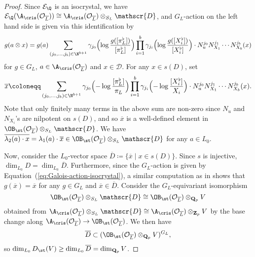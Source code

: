 \begin{proof}
Since $\mathcal{E}_\Q$ is an isocrystal, we have $\mathcal{E}_\Q(\A_{\cris}(\mathcal{O}_{\overline{L}})) \cong \A_{\cris}(\mathcal{O}_{\overline{L}})\otimes_{S_L} \mathscr{D}$, and $G_L$-action on the left hand side is given via this identification by
\begin{equation} \label{eq:Galois-action-isocrystal}
g(a\otimes x) = g(a)\sum_{(j_0, \ldots, j_b)\in \N^{b+1}} \gamma_{j_0}\Bigl(\operatorname{log}\frac{g([\pi_L^{\flat}])}{[\pi_L^{\flat}]}\Bigr)\prod_{i=1}^b \gamma_{j_i}\Bigl(\operatorname{log}\frac{g([X_i^{\flat}])}{[X_i^{\flat}]}\Bigr) \cdot N_u^{j_0}N_{X_1}^{j_1}\cdots N_{X_b}^{j_b}(x)    
\end{equation}
for $g \in G_L$, $a \in \A_{\cris}(\mathcal{O}_{\overline{L}})$ and $x \in \mathscr{D}$. For any $x \in s(D)$, set
\[
\overline{x} \coloneqq \sum_{(j_0, \ldots, j_b)\in \N^{b+1}} \gamma_{j_0}\Bigl(-\operatorname{log}\frac{[\pi_L^{\flat}]}{\pi_L}\Bigr)\prod_{i=1}^b \gamma_{j_i}\Bigl(-\operatorname{log}\frac{[X_i^{\flat}]}{X_i}\Bigr) \cdot N_u^{j_0}N_{X_1}^{j_1}\cdots N_{X_b}^{j_b}(x).
\]
Note that only finitely many terms in the above sum are non-zero since $N_u$ and $N_{X_i}$'s are nilpotent on $s(D)$, and so $\overline{x}$ is a well-defined element in $\OB_{\st}(\mathcal{O}_{\overline{L}})\otimes_{S_L} \mathscr{D}$. We have $\overline{\lambda_2(a)\cdot x} = \lambda_1(a)\cdot \overline{x} \in \OB_{\st}(\mathcal{O}_{\overline{L}})\otimes_{S_L} \mathscr{D}$ for any $a \in L_0$.

Now, consider the $L_0$-vector space $\overline{D} \coloneqq \{\overline{x} \mid x \in s(D)\}$. Since $s$ is injective, $\dim_{L_0} D = \dim_{L_0} \overline{D}$. Furthermore, since the $G_L$-action is given by Equation~(\ref{eq:Galois-action-isocrystal}), a similar computation as in \cite[\S7.2]{liu-fontaineconjecture} shows that $g(\overline{x}) = \overline{x}$ for any $g \in G_L$ and $\overline{x} \in \overline{D}$. Consider the $G_L$-equivariant isomorphism
\[
\OB_{\st}(\mathcal{O}_{\overline{L}})\otimes_{S_L} \mathscr{D} \cong \OB_{\st}(\mathcal{O}_{\overline{L}})\otimes_{\mathbf{Q}_p} V
\]
obtained from $\A_{\cris}(\mathcal{O}_{\overline{L}})\otimes_{S_L} \mathscr{D} \cong \A_{\cris}(\mathcal{O}_{\overline{L}})\otimes_{\mathbf{Z}_p} V$ by the base change along $\A_{\cris}(\mathcal{O}_{\overline{L}}) \rightarrow \OB_{\st}(\mathcal{O}_{\overline{L}})$. We then have 
\[
\overline{D} \subset (\OB_{\st}(\mathcal{O}_{\overline{L}})\otimes_{\mathbf{Q}_p} V)^{G_L},
\]
so $\dim_{L_0} D_{\st}(V) \geq \dim_{L_0} \overline{D} = \dim_{\mathbf{Q}_p} V$.
\end{proof}


